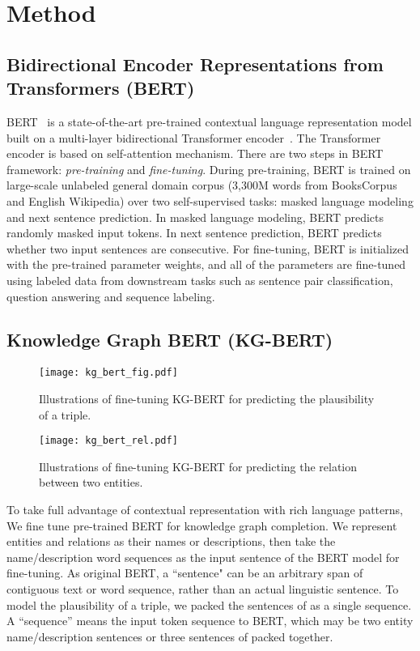 \documentclass[letterpaper]{article} \usepackage{aaai20}  \usepackage{times}  \usepackage{helvet} \usepackage{courier}  \usepackage[hyphens]{url}  \usepackage{graphicx} \urlstyle{rm} \def\UrlFont{\rm}  \usepackage{graphicx}  \usepackage{amsmath}
\begin{document}
\section{Method}
\subsection{Bidirectional
Encoder Representations from Transformers (BERT)}

BERT~\cite{devlin2019bert} is a state-of-the-art pre-trained contextual language representation model built on a multi-layer bidirectional Transformer encoder~\cite{vaswani2017attention}. The Transformer encoder is based on self-attention mechanism. There are two steps in BERT framework: \textit{pre-training} and \textit{fine-tuning}. During pre-training, BERT is trained on large-scale unlabeled general domain corpus (3,300M words from BooksCorpus and English Wikipedia) over two self-supervised tasks: masked language modeling and next sentence prediction. In masked language modeling, BERT predicts randomly masked input tokens. In next sentence prediction, BERT predicts whether two input sentences are consecutive. For fine-tuning, BERT is initialized with the pre-trained parameter weights, and all of the parameters are fine-tuned using labeled data from downstream tasks such as sentence pair classification, question answering and sequence labeling.


\subsection{Knowledge Graph BERT (KG-BERT)}

\begin{figure*}[t]
  \centering
  \texttt{[image: kg\_bert\_fig.pdf]}
  \caption{Illustrations of fine-tuning KG-BERT for predicting the plausibility of a triple.}
  \label{fig:framework}
\end{figure*}


\begin{figure}[h]
  \centering
  \texttt{[image: kg\_bert\_rel.pdf]}
  \caption{Illustrations of fine-tuning KG-BERT for predicting the relation between two entities.}
  \label{fig:framework}
\end{figure}

To take full advantage of contextual representation with rich language patterns, We fine tune pre-trained BERT for knowledge graph completion. We represent entities and relations as their names or descriptions, then take the name/description word sequences as the input sentence of the BERT model for fine-tuning. As original BERT, a ``sentence" can be an arbitrary span of contiguous text or word sequence, rather than an actual linguistic sentence. To model the plausibility of a triple, we packed the sentences of  as a single sequence.  A “sequence” means the input token sequence to BERT, which may be two entity name/description sentences or three sentences of  packed together. 
\end{document}
